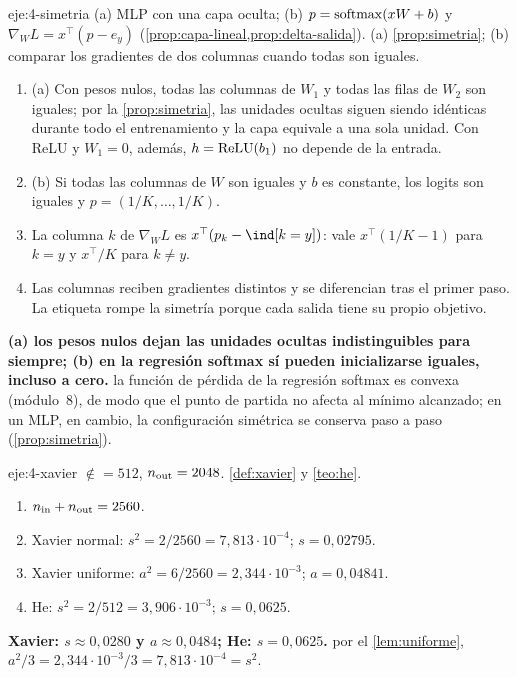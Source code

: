 \begin{solucion}{eje:4-simetria}
\datos (a) MLP con una capa oculta; (b) $p=\operatorname{softmax}(xW+b)$ y $\nabla_{\!W}L=x^{\top}(p-e_y)$ (\cref{prop:capa-lineal,prop:delta-salida}).
\planteamiento (a) \cref{prop:simetria}; (b) comparar los gradientes de dos columnas cuando todas son iguales.
\pasos
\begin{enumerate}[label=\arabic*.]
  \item (a) Con pesos nulos, todas las columnas de $W_1$ y todas las filas de $W_2$ son iguales; por la \cref{prop:simetria}, las unidades ocultas siguen siendo idénticas durante todo el entrenamiento y la capa equivale a una sola unidad. Con ReLU y $W_1=0$, además, $h=\operatorname{ReLU}(b_1)$ no depende de la entrada.
  \item (b) Si todas las columnas de $W$ son iguales y $b$ es constante, los logits son iguales y $p=(1/K,\dots,1/K)$.
  \item La columna $k$ de $\nabla_{\!W}L$ es $x^{\top}(p_k-\ind[k=y])$: vale $x^{\top}(1/K-1)$ para $k=y$ y $x^{\top}/K$ para $k\neq y$.
  \item Las columnas reciben gradientes distintos y se diferencian tras el primer paso. La etiqueta rompe la simetría porque cada salida tiene su propio objetivo.
\end{enumerate}
\resultado \textbf{(a) los pesos nulos dejan las unidades ocultas indistinguibles para siempre; (b) en la regresión softmax sí pueden inicializarse iguales, incluso a cero.}
\comprobacion la función de pérdida de la regresión softmax es convexa (módulo~8), de modo que el punto de partida no afecta al mínimo alcanzado; en un MLP, en cambio, la configuración simétrica se conserva paso a paso (\cref{prop:simetria}).
\end{solucion}

\begin{solucion}{eje:4-xavier}
\datos $\nin=512$, $n_{\mathrm{out}}=2048$.
\planteamiento \cref{def:xavier} y \cref{teo:he}.
\pasos
\begin{enumerate}[label=\arabic*.]
  \item $n_{\mathrm{in}}+n_{\mathrm{out}}=2560$.
  \item Xavier normal: $s^{2}=2/2560=7{,}813\cdot 10^{-4}$; $s=0{,}02795$.
  \item Xavier uniforme: $a^{2}=6/2560=2{,}344\cdot 10^{-3}$; $a=0{,}04841$.
  \item He: $s^{2}=2/512=3{,}906\cdot 10^{-3}$; $s=0{,}0625$.
\end{enumerate}
\resultado \textbf{Xavier: $s\approx 0{,}0280$ y $a\approx 0{,}0484$; He: $s=0{,}0625$.}
\comprobacion por el \cref{lem:uniforme}, $a^{2}/3=2{,}344\cdot 10^{-3}/3=7{,}813\cdot 10^{-4}=s^{2}$.
\end{solucion}


